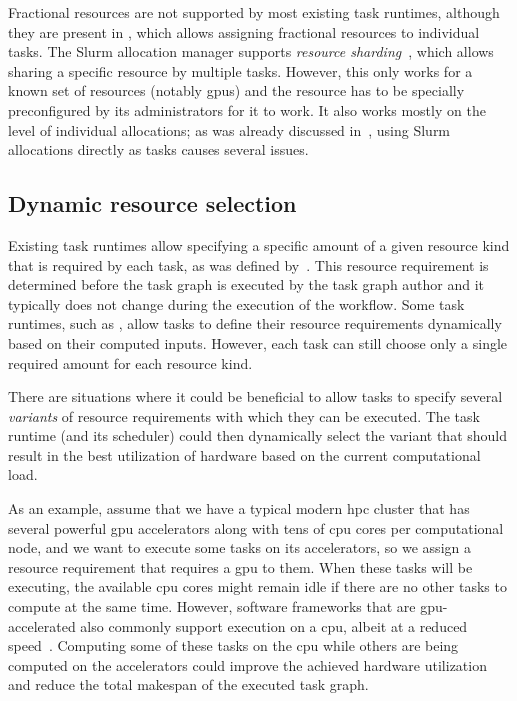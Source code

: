 Fractional resources are not supported by most existing task runtimes, although they are present in
\ray{}, which allows assigning fractional resources to individual tasks. The Slurm
allocation manager supports \emph{resource sharding}~\cite{slurm-sharding}, which allows sharing a
specific resource by multiple tasks. However, this only works for a known set of resources (notably
\glspl{gpu}) and the resource has to be specially preconfigured by its administrators
for it to work. It also works mostly on the level of individual allocations; as was already
discussed in~, using Slurm allocations directly as tasks causes several
issues.

\subsection{Dynamic resource selection}
\label{sec:dynamic-resource-selection}
Existing task runtimes allow specifying a specific amount of a given resource kind that is required
by each task, as was defined by~. This resource requirement is determined
before the task graph is executed by the task graph author and it typically does not change
during the execution of the workflow. Some task runtimes, such as \snakemake{}, allow tasks to
define their resource requirements dynamically based on their computed inputs. However, each task
can still choose only a single required amount for each resource kind.

There are situations where it could be beneficial to allow tasks to specify several
\emph{variants} of resource requirements with which they can be executed. The task
runtime (and its scheduler) could then dynamically select the variant that should result in the best
utilization of hardware based on the current computational load.

As an example, assume that we have a typical modern \gls{hpc} cluster that has
several powerful \gls{gpu} accelerators along with tens of \gls{cpu}
cores per computational node, and we want to execute some tasks on its accelerators, so we assign a
resource requirement that requires a \gls{gpu} to them. When these tasks will be
executing, the available \gls{cpu} cores might remain idle if there are no other
tasks to compute at the same time. However, software frameworks that are
\gls{gpu}-accelerated also commonly support execution on a \gls{cpu},
albeit at a reduced speed~\cite{gromacs,tensorflow}. Computing some of these tasks on the
\gls{cpu} while others are being computed on the accelerators could improve the achieved
hardware utilization and reduce the total makespan of the executed task graph.

